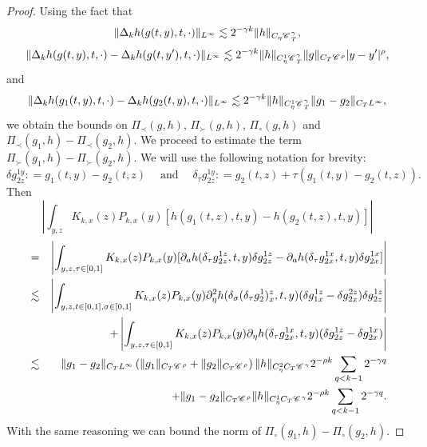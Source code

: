 \documentclass[11pt,reqno]{amsart}
\newcommand{\tmop}[1]{\ensuremath{\operatorname{#1}}}
\newcommand{\CC}{\mathscr{C} \hspace{.1em}}
\begin{document}
\begin{proof}
  Using the fact that
  \[ \| \Delta_k h (g (t, y), t, \cdot) \|_{L^{\infty}} \lesssim 2^{- \gamma
     k} \| h \|_{C_{\eta} \CC_T^{\gamma}}, \]
  \[ \| \Delta_k h (g (t, y), t, \cdot) - \Delta_k h (g (t, y'), t, \cdot)
     \|_{L^{\infty}} \lesssim 2^{- \gamma k} \| h \|_{C_{\eta}^1
     \CC_T^{\gamma}} \| g \|_{C_T  \CC^{\rho}} | y - y' |^{\rho}, \]
  and
  \[ \| \Delta_k h (g_1 (t, y), t, \cdot) - \Delta_k h (g_2 (t, y), t, \cdot)
     \|_{L^{\infty}} \lesssim 2^{- \gamma k} \| h \|_{C_{\eta}^1
     \CC_T^{\gamma}} \| g_1 - g_2 \|_{C_T L^{\infty}}, \]
  we obtain the bounds on $\Pi_{\prec} (g, h)$, $\Pi_{\succ} (g, h)$,
  $\Pi_{\circ} (g, h)$ and $\Pi_{\prec} (g_1, h) - \Pi_{\prec} (g_2, h)$. We
  proceed to estimate the term $\Pi_{\succ} (g_1, h) - \Pi_{\succ} (g_2, h)$.
  We will use the following notation for brevity:
  \[ \delta g_{2 z}^{1 y} : = g_1 (t, y) - g_2 (t, z) \quad \tmop{and} \quad
     \delta_{\tau} g_{2 z}^{1 y} : = g_2 (t, z) + \tau (g_1  (t, y) - g_2 (t,
     z)) . \]
  Then
  \[ \left| \int_{y, z} K_{k, x} (z) P_{k, x} (y) [h (g_1 (t, z), t, y) - h
     (g_2 (t, z), t, y)] \right| \]
  \begin{eqnarray*}
    & = & \left| \int_{y, z, \tau \in [0, 1]} K_{k, x} (z) P_{k, x} (y)
    [\partial_a h (\delta_{\tau} g_{2 z}^{1 z}, t, y) \delta g_{2 z}^{1 z} -
    \partial_a h (\delta_{\tau} g_{2 x}^{1 x}, t, y) \delta g_{2 x}^{1 x}]
    \right|\\
    & \lesssim & \left| \int_{y, z, t \in [0, 1], \sigma \in [0, 1]} K_{k, x}
    (z) P_{k, x} (y) \partial^2_{\eta} h (\delta_{\sigma} (\delta_{\tau}
    g_2^1)^z_x, t, y) (\delta g^{1 z}_{1 x} - \delta g^{2 z}_{2 x}) \delta
    g_{2 z}^{1 z} \right|\\
    &  & + \left| \int_{y, z, \tau \in [0, 1]} K_{k, x} (z) P_{k, x} (y)
    \partial_{\eta} h (\delta_{\tau} g_{2 x}^{1 x}, t, y) (\delta g_{2 z}^{1
    z} - \delta g_{2 x}^{1 x}) \right|\\
    & \lesssim & \| g_1 - g_2 \|_{C_T L^{\infty}} \left( \| g_1 \|_{C_T
    \CC^{\rho}} + \| g_2 \|_{C_T \CC^{\rho}} \right) \| h \|_{C_{\eta}^2 C_T
    \CC^{\gamma}} 2^{- \rho k} \sum_{q < k - 1} 2^{- \gamma q}\\
    &  & + \| g_1 - g_2 \|_{C_T \CC^{\rho}}  \| h \|_{C_{\eta}^1 C_T
    \CC^{\gamma}} 2^{- \rho k} \sum_{q < k - 1} 2^{- \gamma q} .
  \end{eqnarray*}
  With the same reasoning we can bound the norm of $\Pi_{\circ} (g_1, h) -
  \Pi_{\circ} (g_2, h)$.
\end{proof}
\end{document}
